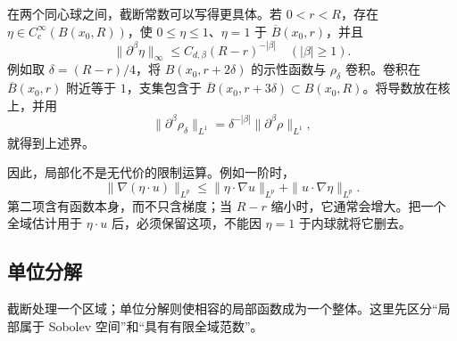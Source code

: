 在两个同心球之间，截断常数可以写得更具体。若 \(0<r<R\)，存在 \(\eta\in C_c^\infty(B(x_0,R))\)，使 \(0\le\eta\le1\)、\(\eta=1\) 于 \(\overline B(x_0,r)\)，并且
\begin{equation}\label{b1:eq:ball-cutoff-derivatives}
 \|\partial^\beta\eta\|_\infty
 \le C_{d,\beta}(R-r)^{-|\beta|}
 \quad(|\beta|\ge1).
\end{equation}
例如取 \(\delta=(R-r)/4\)，将 \(B(x_0,r+2\delta)\) 的示性函数与 \(\rho_\delta\) 卷积。卷积在 \(\overline B(x_0,r)\) 附近等于 \(1\)，支集包含于 \(\overline B(x_0,r+3\delta)\subset B(x_0,R)\)。将导数放在核上，并用
\[
 \|\partial^\beta\rho_\delta\|_{L^1}
 =\delta^{-|\beta|}\|\partial^\beta\rho\|_{L^1},
\]
就得到上述界。

\ProseParagraphBreak

因此，局部化不是无代价的限制运算。例如一阶时，
\[
 \|\nabla(\eta\cdot u)\|_{L^p}
 \le \|\eta\cdot\nabla u\|_{L^p}
      +\|u\cdot\nabla\eta\|_{L^p}.
\]
第二项含有函数本身，而不只含梯度；当 \(R-r\) 缩小时，它通常会增大。把一个全域估计用于 \(\eta\cdot u\) 后，必须保留这项，不能因 \(\eta=1\) 于内球就将它删去。

\subsection{单位分解}
\label{b1:subsec:220402}

截断处理一个区域；单位分解则使相容的局部函数成为一个整体。这里先区分“局部属于 Sobolev 空间”和“具有有限全域范数”。


